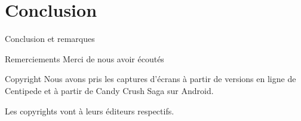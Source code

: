 \documentclass{beamer}
\begin{document}
\section{Conclusion}
\begin{frame}{Conclusion et remarques}
	\begin{block}{Remerciements}
		Merci de nous avoir écoutés
	\end{block}
	\begin{block}{Copyright}
		Nous avons pris les captures d'écrans à partir de versions en ligne de Centipede et à partir de Candy Crush Saga sur Android.

Les copyrights vont à leurs éditeurs respectifs.
	\end{block}
\end{frame}
\end{document}
